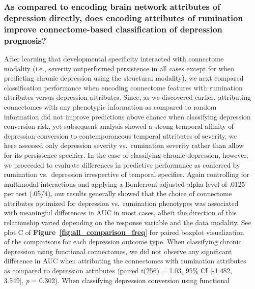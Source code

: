\documentclass[
  notitlepage]{article}
\begin{document}
\hypertarget{as-compared-to-encoding-brain-network-attributes-of-depression-directly-does-encoding-attributes-of-rumination-improve-connectome-based-classification-of-depression-prognosis}{%
\subsubsection{As compared to encoding brain network attributes of
depression directly, does encoding attributes of rumination improve
connectome-based classification of depression
prognosis?}\label{as-compared-to-encoding-brain-network-attributes-of-depression-directly-does-encoding-attributes-of-rumination-improve-connectome-based-classification-of-depression-prognosis}}
After learning that developmental specificity interacted with connectome
modality (i.e., severity outperformed persistence in all cases except
for when predicting chronic depression using the structural modality),
we next compared classification performance when encoding connectome
features with rumination attributes versus depression attributes. Since,
as we discovered earlier, attributing connectomes with any phenotypic
information as compared to random information did not improve
predictions above chance when classifying depression conversion risk,
yet subsequent analysis showed a strong temporal affinity of depression
conversion to contemporaneous temporal attributes of severity, we here
assessed only depression severity vs.~rumination severity rather than
allow for its persistence specifier. In the case of classifying chronic
depression, however, we proceeded to evaluate differences in predictive
performance as conferred by rumination vs.~depression irrespective of
temporal specifier. Again controlling for multimodal interactions and
applying a Bonferroni adjusted alpha level of .0125 per test (.05/4),
our results generally showed that the choice of connectome attributes
optimized for depression vs.~rumination phenotypes was associated with
meaningful differences in AUC in most cases, albeit the direction of
this relationship varied depending on the response variable and the data
modality. See plot C of \textbf{Figure~\ref{fig:all_comparison_freq}} for paired
boxplot visualization of the comparisons for each depression outcome
type. When classifying chronic depression using functional connectomes,
we did not observe any significant difference in AUC when attributing
the connectomes with rumination attributes as compared to depression
attributes (paired t(256) = 1.03, 95\% CI {[}-1.482, 3.549{]}, \emph{p}
= 0.302). When classifying depression conversion using functional
\end{document}
